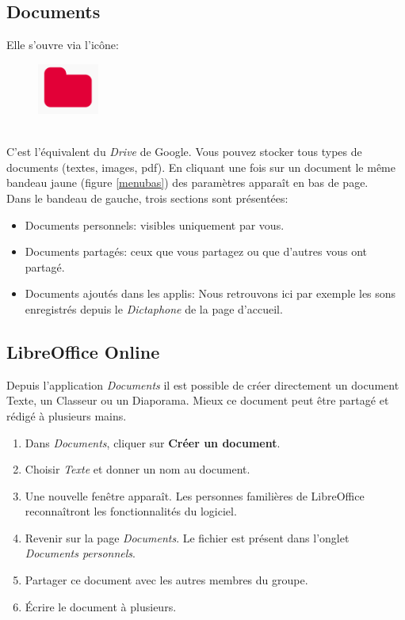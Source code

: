 \documentclass[a4paper,11pt]{article}
\begin{document}
\begin{Form}
\subsection{Documents}
Elle s'ouvre via l'icône:
\begin{figure}[!h]
\centering
\includegraphics[width=2cm]{ressources/documents.png}
\label{docs}
\end{figure}
\\C'est l'équivalent du \emph{Drive} de Google. Vous pouvez stocker tous types de documents (textes, images, pdf). En cliquant une fois sur un document le même bandeau jaune (figure \ref{menubas}) des paramètres apparaît en bas de page.\\
Dans le bandeau de gauche, trois sections sont présentées:
\begin{itemize}
\item Documents personnels: visibles uniquement par vous.
\item Documents partagés: ceux que vous partagez ou que d'autres vous ont partagé.
\item Documents ajoutés dans les applis: Nous retrouvons ici par exemple les sons enregistrés depuis le \emph{Dictaphone} de la page d'accueil.
\end{itemize}
\subsection{LibreOffice Online}
Depuis l'application \emph{Documents} il est possible de créer directement un document Texte, un Classeur ou un Diaporama. Mieux ce document peut être partagé et rédigé à plusieurs mains.
\begin{activite}
\begin{enumerate}
\item Dans \emph{Documents}, cliquer sur \textbf{Créer un document}.
\item Choisir \emph{Texte} et donner un nom au document.
\item Une nouvelle fenêtre apparaît. Les personnes familières de LibreOffice reconnaîtront les fonctionnalités du logiciel.
\item Revenir sur la page \emph{Documents}. Le fichier est présent dans l'onglet \emph{Documents personnels}.
\item Partager ce document avec les autres membres du groupe.
\item Écrire le document à plusieurs.
\end{enumerate}
\end{activite}

\end{Form}
\end{document}

